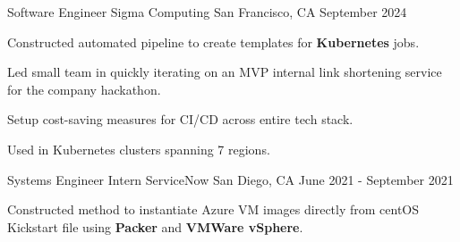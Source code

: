 \begin{cventries}
  \cventry
    {Software Engineer}
    {Sigma Computing}
    {San Francisco, CA}
    {September 2024}
    {
      \begin{cvitems}
        \item {Constructed automated pipeline to create templates for \textbf{Kubernetes} jobs.}
        \item {Led small team in quickly iterating on an MVP internal link shortening service for the company hackathon.}
        \item {Setup cost-saving measures for CI/CD across entire tech stack.}
        \item {Used in Kubernetes clusters spanning 7 regions.}
      \end{cvitems}
    }
  \cventry
    {Systems Engineer Intern}
    {ServiceNow}
    {San Diego, CA}
    {June 2021 - September 2021}
    {
      \begin{cvitems}
        \item {Constructed method to instantiate Azure VM images directly from centOS Kickstart file using \textbf{Packer} and \textbf{VMWare vSphere}.}

\end{cvitems}}
\end{cventries}
